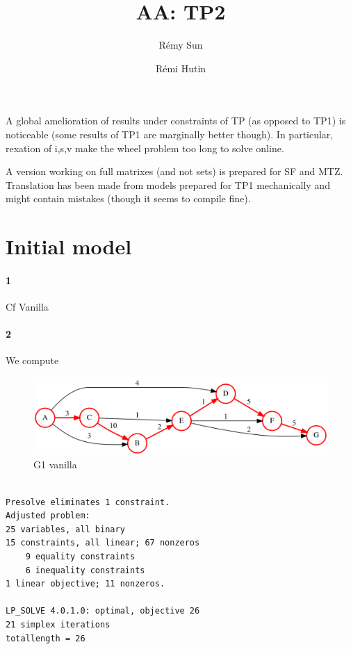 \documentclass{article}
\author{Rémy Sun \and Rémi Hutin}
\title{AA: TP2}
\begin{document}
\maketitle

A global amelioration of results under constraints of TP (as opposed to TP1) is
noticeable (some results of TP1 are marginally better though). In particular,
rexation of i,s,v make the wheel problem too long to solve online.

A version working on full matrixes (and not sets) is prepared for SF and MTZ.
Translation has been made from models prepared for TP1 mechanically and might
contain mistakes (though it seems to compile fine).

\section{Initial model}

\paragraph{1}

Cf Vanilla

\paragraph{2}

We compute

\begin{figure}[H]
  \centering
  \includegraphics[scale=0.3]{graph/vanilla_G1}
  \caption{G1 vanilla}
\end{figure}

\begin{lstlisting}

Presolve eliminates 1 constraint.
Adjusted problem:
25 variables, all binary
15 constraints, all linear; 67 nonzeros
	9 equality constraints
	6 inequality constraints
1 linear objective; 11 nonzeros.

LP_SOLVE 4.0.1.0: optimal, objective 26
21 simplex iterations
totallength = 26

\end{lstlisting}
\end{document}

